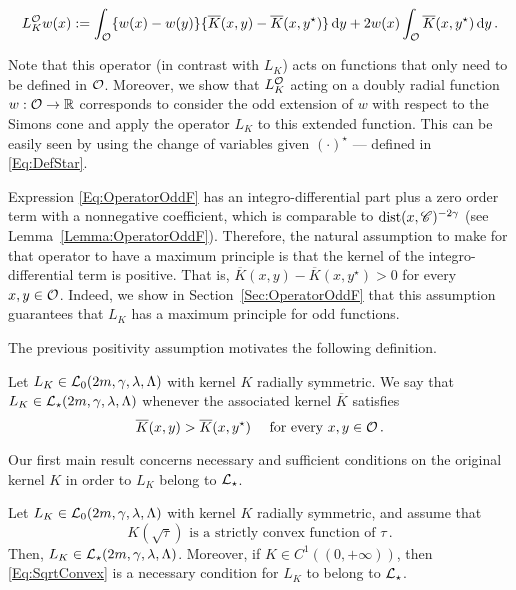 \begin{equation}
\label{Eq:OperatorOddF}
	L_K^{\mathcal{O}} w (x) := \int_{\mathcal{O}} \{w(x) - w(y) \} \{\overline{K}(x, y) - \overline{K}(x, y^\star)  \} \,\mathrm{d} y +  2 w(x) \int_{\mathcal{O}} \overline{K}(x, y^\star) \,\mathrm{d} y \,.
\end{equation}

Note that this operator (in contrast with $L_K$) acts on functions that only need to be defined in $\mathcal{O}$. Moreover, we show that $L_K^{\mathcal{O}}$ acting on a doubly radial function $w:\mathcal{O} \to \mathbb{R}$ corresponds to consider the odd extension of $w$ with respect to the Simons cone and apply the operator $L_K$ to this extended function. This can be easily seen by using the change of variables given $(\cdot)^\star$ --- defined in \eqref{Eq:DefStar}.

Expression \eqref{Eq:OperatorOddF} has an integro-differential part plus a zero order term with a nonnegative coefficient, which is comparable to $\operatorname{dist}(x,\mathscr{C})^{-2\gamma}$ (see Lemma~\ref{Lemma:OperatorOddF}). Therefore, the natural assumption to make for that operator to have a maximum principle is that the kernel of the integro-differential term is positive. That is, $\overline{K}(x, y) - \overline{K}(x, y^\star)>0$ for every $x,y\in \mathcal{O}$. Indeed, we show in Section~\ref{Sec:OperatorOddF} that this assumption guarantees that $L_K$ has a maximum principle for odd functions. 

The previous positivity assumption motivates the following definition.

\begin{definition}
	Let $L_K \in \mathcal{L}_0(2m,\gamma,\lambda, \Lambda)$ with kernel $K$ radially symmetric. We say that $L_K\in \mathcal{L}_\star (2m,\gamma,\lambda, \Lambda)$ whenever the associated kernel $\overline{K}$ satisfies
	\begin{equation}
		\label{Eq:KernelInequality}
		\overline{K}(x,y) > \overline{K}(x, y^\star) \quad \text{ for every }x,y \in \mathcal{O}\,.
	\end{equation}
\end{definition}

Our first main result concerns necessary and sufficient conditions on the original kernel $K$ in order to $L_K$ belong to $\mathcal{L}_\star$.

\begin{theorem}
	\label{Th:CharacterizationLstar}
	Let $L_K \in \mathcal{L}_0(2m,\gamma,\lambda, \Lambda)$ with kernel $K$ radially symmetric, and assume that 
	\begin{equation}
		\label{Eq:SqrtConvex}	
		K(\sqrt{\tau}) \text{ is a strictly convex function of }\tau\,.
	\end{equation}
	Then, $L_K\in \mathcal{L}_\star(2m,\gamma,\lambda, \Lambda)$. Moreover, if $K\in C^1((0,+\infty))$, then \eqref{Eq:SqrtConvex} is a necessary condition for $L_K$ to belong to $\mathcal{L}_\star$.
\end{theorem}

